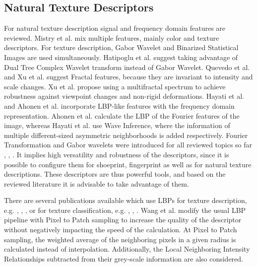 \documentclass[draft,final]{vutinfth} %
\begin{document}
\subsection{Natural Texture Descriptors}
\par
For natural texture description signal and frequency domain features are reviewed.
Mistry et al. \cite{mistry2017content} mix multiple features, mainly color and texture descriptors.
For texture description, Gabor Wavelet and Binarized Statistical Images  \cite{kannala2012bsif} are used simultaneously.
Hatipoglu et al. \cite{hatipoglu2000image} suggest taking advantage of Dual Tree Complex Wavelet transform instead of Gabor Wavelet.
Quevedo et al. \cite{quevedo2002description} and Xu et al. \cite{xu2009viewpoint} suggest Fractal features, because they are invariant to intensity and scale changes.
Xu et al. \cite{xu2009viewpoint} propose using a multifractal spectrum to achieve robustness against viewpoint changes and non-rigid deformations.
Hayati et al. \cite{hayati2018wirif} and Ahonen et al. \cite{ahonen2009rotation} incorporate LBP-like features with the frequency domain representation.
Ahonen et al. \cite{ahonen2009rotation} calculate the LBP of the Fourier features of the image, whereas Hayati et al. \cite{hayati2018wirif} use Wave Inference, where the information of multiple different-sized asymmetric neighborhoods is added respectively.
Fourier Transformation and Gabor wavelets were introduced for all reviewed topics so far \cite{kortylewski2014unsupervised}, \cite{wu2019crime}, \cite{bolle2012fingerprint}.
It implies high versatility and robustness of the descriptors, since it is possible to configure them for shoeprint, fingerprint as well as for natural texture descriptions.  
These descriptors are thus powerful tools, and based on the reviewed literature it is advisable to take advantage of them.
\par
There are several publications available which use LBPs for texture description, e.g. \cite{guo2012discriminative}, \cite{hong2014combining}, \cite{ahonen2009rotation}, or for texture classification, e.g. \cite{khellah2011texture}, \cite{guo2010rotation}, \cite{zhang2017learning}.
Wang et al. \cite{wang2013pixel} modify the usual LBP pipeline with Pixel to Patch sampling to increase the quality of the descriptor without negatively impacting the speed of the calculation.
At Pixel to Patch sampling, the weighted average of the neighboring pixels in a given radius is calculated instead of interpolation.
Additionally, the Local Neighboring Intensity Relationships subtracted from their grey-scale information are also considered.
\end{document}
